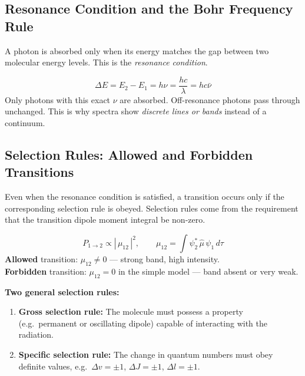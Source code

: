 \documentclass[12pt,a4paper]{article}
\begin{document}
\subsection{Resonance Condition and the Bohr Frequency Rule}
A photon is absorbed only when its energy matches the gap between two molecular energy levels. This is the \emph{resonance condition}.

\begin{tcolorbox}[formulabox, title={Bohr Frequency Condition}]
\[
\Delta E = E_2 - E_1 = h\nu = \frac{hc}{\lambda} = hc\bar{\nu}
\]
Only photons with this exact $\nu$ are absorbed. Off-resonance photons pass through unchanged. This is why spectra show \emph{discrete lines or bands} instead of a continuum.
\end{tcolorbox}

\subsection{Selection Rules: Allowed and Forbidden Transitions}
Even when the resonance condition is satisfied, a transition occurs only if the corresponding selection rule is obeyed. Selection rules come from the requirement that the transition dipole moment integral be non-zero.

\begin{tcolorbox}[formulabox, title={Transition Probability and Dipole Moment}]
\[
P_{1\to2} \propto |\,\mu_{12}\,|^{2}, \qquad
\mu_{12}=\int \psi_2^{*}\,\hat{\mu}\,\psi_1\,d\tau
\]
\textbf{Allowed} transition: $\mu_{12}\neq 0$ — strong band, high intensity.\\
\textbf{Forbidden} transition: $\mu_{12}=0$ in the simple model — band absent or very weak.
\end{tcolorbox}

\textbf{Two general selection rules:}
\begin{enumerate}[leftmargin=*, itemsep=2pt, topsep=2pt]
  \item \textbf{Gross selection rule:} The molecule must possess a property (e.g.\ permanent or oscillating dipole) capable of interacting with the radiation.
  \item \textbf{Specific selection rule:} The change in quantum numbers must obey definite values, e.g.\ $\Delta v = \pm 1$, $\Delta J = \pm 1$, $\Delta l = \pm 1$.
\end{enumerate}
\end{document}
